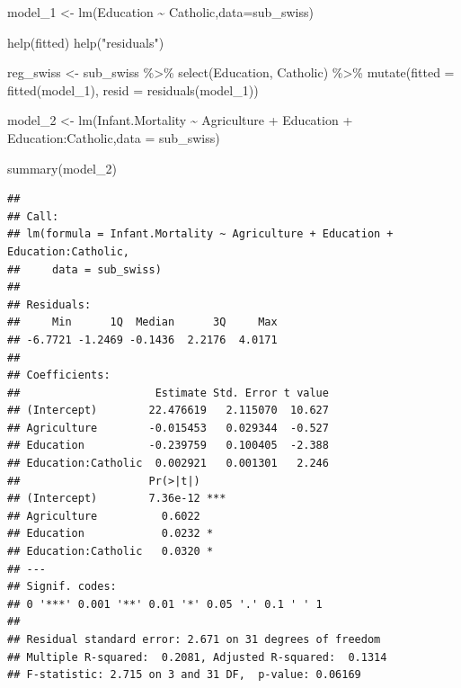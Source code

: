 \documentclass[
]{book}
\newenvironment{Shaded}{\begin{snugshade}}{\end{snugshade}}
\newcommand{\AttributeTok}[1]{\textcolor[rgb]{0.77,0.63,0.00}{#1}}
\newcommand{\FunctionTok}[1]{\textcolor[rgb]{0.00,0.00,0.00}{#1}}
\newcommand{\NormalTok}[1]{#1}
\newcommand{\OtherTok}[1]{\textcolor[rgb]{0.56,0.35,0.01}{#1}}
\newcommand{\SpecialCharTok}[1]{\textcolor[rgb]{0.00,0.00,0.00}{#1}}
\newcommand{\StringTok}[1]{\textcolor[rgb]{0.31,0.60,0.02}{#1}}
\begin{document}
\hypertarget{solution2}{}
\begin{Shaded}
\begin{Highlighting}[]
\NormalTok{model\_1 }\OtherTok{\textless{}{-}} \FunctionTok{lm}\NormalTok{(Education }\SpecialCharTok{\textasciitilde{}}\NormalTok{ Catholic,}\AttributeTok{data=}\NormalTok{sub\_swiss)}

\FunctionTok{help}\NormalTok{(}\StringTok{\textquotesingle{}fitted\textquotesingle{}}\NormalTok{)}
\FunctionTok{help}\NormalTok{(}\StringTok{"residuals"}\NormalTok{)}

\NormalTok{reg\_swiss }\OtherTok{\textless{}{-}}\NormalTok{ sub\_swiss }\SpecialCharTok{\%\textgreater{}\%} 
  \FunctionTok{select}\NormalTok{(Education, Catholic) }\SpecialCharTok{\%\textgreater{}\%} 
  \FunctionTok{mutate}\NormalTok{(}\AttributeTok{fitted =} \FunctionTok{fitted}\NormalTok{(model\_1),}
         \AttributeTok{resid =} \FunctionTok{residuals}\NormalTok{(model\_1))}

\NormalTok{model\_2 }\OtherTok{\textless{}{-}} \FunctionTok{lm}\NormalTok{(Infant.Mortality }\SpecialCharTok{\textasciitilde{}}\NormalTok{ Agriculture }\SpecialCharTok{+}\NormalTok{ Education }\SpecialCharTok{+}\NormalTok{ Education}\SpecialCharTok{:}\NormalTok{Catholic,}\AttributeTok{data =}\NormalTok{ sub\_swiss)}

\FunctionTok{summary}\NormalTok{(model\_2)}
\end{Highlighting}
\end{Shaded}

\begin{verbatim}
## 
## Call:
## lm(formula = Infant.Mortality ~ Agriculture + Education + Education:Catholic, 
##     data = sub_swiss)
## 
## Residuals:
##     Min      1Q  Median      3Q     Max 
## -6.7721 -1.2469 -0.1436  2.2176  4.0171 
## 
## Coefficients:
##                     Estimate Std. Error t value
## (Intercept)        22.476619   2.115070  10.627
## Agriculture        -0.015453   0.029344  -0.527
## Education          -0.239759   0.100405  -2.388
## Education:Catholic  0.002921   0.001301   2.246
##                    Pr(>|t|)    
## (Intercept)        7.36e-12 ***
## Agriculture          0.6022    
## Education            0.0232 *  
## Education:Catholic   0.0320 *  
## ---
## Signif. codes:  
## 0 '***' 0.001 '**' 0.01 '*' 0.05 '.' 0.1 ' ' 1
## 
## Residual standard error: 2.671 on 31 degrees of freedom
## Multiple R-squared:  0.2081, Adjusted R-squared:  0.1314 
## F-statistic: 2.715 on 3 and 31 DF,  p-value: 0.06169
\end{verbatim}
\end{document}
